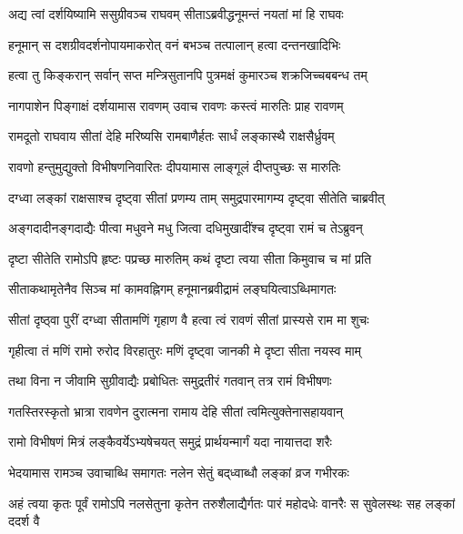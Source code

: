 \twolineshloka
{अद्य त्वां दर्शयिष्यामि ससुग्रीवञ्च राघवम् }
{सीताऽब्रवीद्धनूमन्तं नयतां मां हि राघवः}%

\twolineshloka
{हनूमान् स दशग्रीवदर्शनोपायमाकरोत्}
{वनं बभञ्च तत्पालान् हत्वा दन्तनखादिभिः}%

\twolineshloka
{हत्वा तु किङ्करान् सर्वान् सप्त मन्त्रिसुतानपि}
{पुत्रमक्षं कुमारञ्च शक्रजिच्चबबन्ध तम्}%

\twolineshloka
{नागपाशेन पिङ्गाक्षं दर्शयामास रावणम्}
{उवाच रावणः कस्त्वं मारुतिः प्राह रावणम्}%

\twolineshloka
{रामदूतो राघवाय सीतां देहि मरिष्यसि}
{रामबाणैर्हतः सार्धं लङ्कास्थै राक्षसैर्ध्रुवम्}%

\twolineshloka
{रावणो हन्तुमुद्युक्तो विभीषणनिवारितः}
{दीपयामास लाङ्गूलं दीप्तपुच्छः स मारुतिः}%

\twolineshloka
{दग्ध्वा लङ्कां राक्षसाश्च दृष्ट्वा सीतां प्रणम्य ताम्}
{समुद्रपारमागम्य दृष्ट्वा सीतेति चाब्रवीत्}%

\twolineshloka
{अङ्गदादीनङ्गदाद्यैः पीत्वा मधुवने मधु}
{जित्वा दधिमुखादींश्च दृष्ट्वा रामं च तेऽब्रुवन्}%

\twolineshloka
{दृष्टा सीतेति रामोऽपि हृष्टः पप्रच्छ मारुतिम्}
{कथं दृष्टा त्वया सीता किमुवाच च मां प्रति}%

\twolineshloka
{सीताकथामृतेनैव सिञ्च मां कामवह्निगम्}
{हनूमानब्रवीद्रामं लङ्घयित्वाऽब्धिमागतः}%

\twolineshloka
{सीतां दृष्ठ्वा पुरीं दग्ध्वा सीतामणिं गृहाण वै}
{हत्वा त्वं रावणं सीतां प्रास्यसे राम मा शुचः}%

\twolineshloka
{गृहीत्वा तं मणिं रामो रुरोद विरहातुरः }
{मणिं दृष्ट्वा जानकी मे दृष्टा सीता नयस्व माम्}%

\twolineshloka
{तथा विना न जीवामि सुग्रीवाद्यैः प्रबोधितः}
{समुद्रतीरं गतवान् तत्र रामं विभीषणः}%

\twolineshloka
{गतस्तिरस्कृतो भ्रात्रा रावणेन दुरात्मना}
{रामाय देहि सीतां त्वमित्युक्तेनासहायवान्}%

\twolineshloka
{रामो विभीषणं मित्रं लङ्कैवर्येऽभ्यषेचयत्}
{समुद्रं प्रार्थयन्मार्गं यदा नायात्तदा शरैः}%

\twolineshloka
{भेदयामास रामञ्च उवाचाब्धि समागतः}
{नलेन सेतुं बद्‌ध्वाब्धौ लङ्कां व्रज गभीरकः}%

\threelineshloka
{अहं त्वया कृतः पूर्वं रामोऽपि नलसेतुना}
{कृतेन तरुशैलाद्यैर्गतः पारं महोदधेः}
{वानरैः स सुवेलस्थः सह लङ्कां ददर्श वै} %

